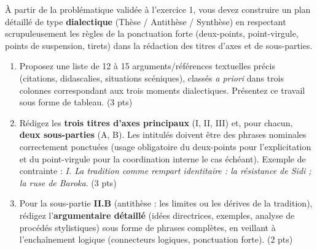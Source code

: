 \documentclass[11pt]{article}
\begin{document}
\begin{exercice}
À partir de la problématique validée à l'exercice 1, vous devez construire un plan détaillé de type \textbf{dialectique} (Thèse / Antithèse / Synthèse) en respectant scrupuleusement les règles de la ponctuation forte (deux-points, point-virgule, points de suspension, tirets) dans la rédaction des titres d'axes et de sous-parties.

\begin{enumerate}
    \item Proposez une liste de 12 à 15 arguments/références textuelles précis (citations, didascalies, situations scéniques), classés \textit{a priori} dans trois colonnes correspondant aux trois moments dialectiques. Présentez ce travail sous forme de tableau. (3 pts)
    \item Rédigez les \textbf{trois titres d'axes principaux} (I, II, III) et, pour chacun, \textbf{deux sous-parties} (A, B). Les intitulés doivent être des phrases nominales correctement ponctuées (usage obligatoire du deux-points pour l'explicitation et du point-virgule pour la coordination interne le cas échéant). Exemple de contrainte : \textit{I. La tradition comme rempart identitaire : la résistance de Sidi ; la ruse de Baroka}. (3 pts)
    \item Pour la sous-partie \textbf{II.B} (antithèse : les limites ou les dérives de la tradition), rédigez l'\textbf{argumentaire détaillé} (idées directrices, exemples, analyse de procédés stylistiques) sous forme de phrases complètes, en veillant à l'enchaînement logique (connecteurs logiques, ponctuation forte). (2 pts)
\end{enumerate}
\end{exercice}
\end{document}
